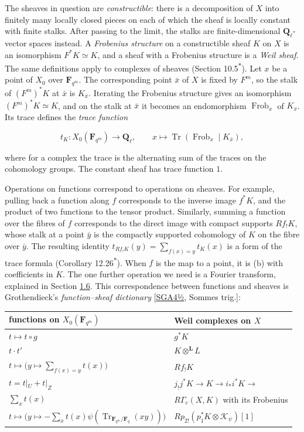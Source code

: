 \documentclass[11pt]{article}
\newcommand{\bpout}[1]{#1\textsuperscript{\hyperlink{bp-outside}{\ensuremath{\ast}}}}
\begin{document}
The sheaves in question are \emph{constructible}: there is a decomposition of \(X\) into finitely many locally closed pieces on each of which the sheaf is locally constant with finite stalks. After passing to the limit, the stalks are finite-dimensional \(\mathbf Q_\ell\)-vector spaces instead. A \emph{Frobenius structure} on a constructible sheaf \(K\) on \(X\) is an isomorphism \(F^*K\simeq K\), and a sheaf with a Frobenius structure is a \emph{Weil sheaf}. The same definitions apply to complexes of sheaves (Section \bpout{10.5}). Let \(x\) be a point of \(X_0\) over \(\mathbf F_{q^m}\). The corresponding point \(\bar x\) of \(X\) is fixed by \(F^m\), so the stalk of \((F^m)^*K\) at \(\bar x\) is \(K_{\bar x}\). Iterating the Frobenius structure gives an isomorphism \((F^m)^*K\simeq K\), and on the stalk at \(\bar x\) it becomes an endomorphism \(\operatorname{Frob}_x\) of \(K_{\bar x}\). Its trace defines the \emph{trace function}

\[
t_K:X_0(\mathbf F_{q^m})\longrightarrow\mathbf Q_\ell,\qquad x\longmapsto
\operatorname{Tr}(\operatorname{Frob}_x\mid K_{\bar x}),
\]

where for a complex the trace is the alternating sum of the traces on the cohomology groups. The constant sheaf has trace function \(1\).

Operations on functions correspond to operations on sheaves. For example, pulling back a function along \(f\) corresponds to the inverse image \(f^*K\), and the product of two functions to the tensor product. Similarly, summing a function over the fibres of \(f\) corresponds to the direct image with compact supports \(Rf_!K\), whose stalk at a point \(\bar y\) is the compactly supported cohomology of \(K\) on the fibre over \(\bar y\). The resulting identity \(t_{Rf_!K}(y)=\sum_{f(x)=y}t_K(x)\) is a form of the trace formula (Corollary \bpout{12.26}). When \(f\) is the map to a point, it is (b) with coefficients in \(K\). The one further operation we need is a Fourier transform, explained in Section \hyperref[bp13]{1.6}. This correspondence between functions and sheaves is Grothendieck's \emph{function–sheaf dictionary} [\hyperref[bp33]{SGA4½}, Sommes trig.]:

\begin{center}\small
\begin{tabular}{ll}
\toprule
functions on \(X_0(\mathbf F_{q^m})\) & Weil complexes on \(X\) \\
\midrule
\(t\mapsto t\circ g\) & \(g^*K\) \\
\(t\cdot t'\) & \(K\otimes^{\mathbf L}L\) \\
\(t\mapsto\bigl(y\mapsto\sum_{f(x)=y}t(x)\bigr)\) & \(Rf_!K\) \\
\(t=t|_{U}+t|_{Z}\) & \(j_!j^*K\to K\to i_*i^*K\to\) \\
\(\sum_xt(x)\) & \(R\Gamma_c(X,K)\) with its Frobenius \\
\(t\mapsto\bigl(y\mapsto-\sum_xt(x)\psi(\operatorname{Tr}_{\mathbf F_{q^m}/\mathbf F_q}(xy))\bigr)\) & \(Rp_{2!}(p_1^*K\otimes\mathcal K_\psi)[1]\) \\
\bottomrule
\end{tabular}
\end{center}
\end{document}
